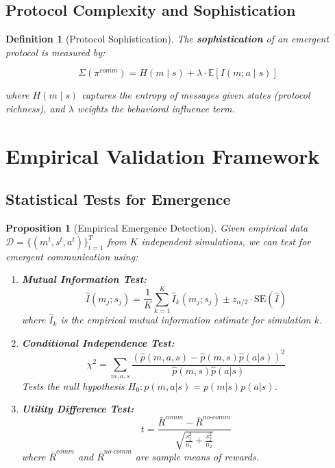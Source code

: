 \documentclass{article}
\newtheorem{definition}{Definition}
\newtheorem{proposition}{Proposition}
\begin{document}
\subsection{Protocol Complexity and Sophistication}

\begin{definition}[Protocol Sophistication]
The \textbf{sophistication} of an emergent protocol is measured by:

\[
\Sigma(\pi^{comm}) = H(m \mid s) + \lambda \cdot \mathbb{E}[I(m; a \mid s)]
\]

where $H(m \mid s)$ captures the entropy of messages given states (protocol richness), and $\lambda$ weights the behavioral influence term.
\end{definition}

\section{Empirical Validation Framework}

\subsection{Statistical Tests for Emergence}

\begin{proposition}[Empirical Emergence Detection]
Given empirical data $\mathcal{D} = \{(m^t, s^t, a^t)\}_{t=1}^T$ from $K$ independent simulations, we can test for emergent communication using:

\begin{enumerate}
    \item \textbf{Mutual Information Test:}
    \[
    \hat{I}(m_j; s_j) = \frac{1}{K} \sum_{k=1}^K \hat{I}_k(m_j; s_j) \pm z_{\alpha/2} \cdot \text{SE}(\hat{I})
    \]
    where $\hat{I}_k$ is the empirical mutual information estimate for simulation $k$.

    \item \textbf{Conditional Independence Test:}
    \[
    \chi^2 = \sum_{m,a,s} \frac{(\hat{p}(m,a,s) - \hat{p}(m,s)\hat{p}(a|s))^2}{\hat{p}(m,s)\hat{p}(a|s)}
    \]
    Tests the null hypothesis $H_0: p(m,a|s) = p(m|s)p(a|s)$.

    \item \textbf{Utility Difference Test:}
    \[
    t = \frac{\bar{R}^{comm} - \bar{R}^{no\text{-}comm}}{\sqrt{\frac{s_1^2}{n_1} + \frac{s_2^2}{n_2}}}
    \]
    where $\bar{R}^{comm}$ and $\bar{R}^{no\text{-}comm}$ are sample means of rewards.
\end{enumerate}
\end{proposition}
\end{document}
